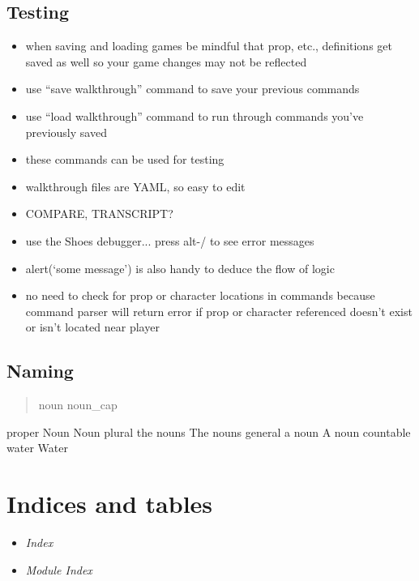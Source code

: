 \documentclass[letterpaper,10pt,english]{manual}
\begin{document}
\section{Testing}
\begin{itemize}
\item {} 
when saving and loading games be mindful that prop, etc., definitions get saved as well so your game changes may not be
reflected

\item {} 
use ``save walkthrough'' command to save your previous commands

\item {} 
use ``load walkthrough'' command to run through commands you've previously saved

\item {} 
these commands can be used for testing

\item {} 
walkthrough files are YAML, so easy to edit

\item {} 
COMPARE, TRANSCRIPT?

\item {} 
use the Shoes debugger... press alt-/ to see error messages

\item {} 
alert(`some message') is also handy to deduce the flow of logic

\item {} 
no need to check for prop or character locations in commands because command parser will return error if prop or character referenced doesn't exist or isn't located near player

\end{itemize}


\section{Naming}
\begin{quote}

noun      noun\_cap
\end{quote}

proper    Noun      Noun
plural    the nouns The nouns
general   a noun    A noun
countable water     Water


\chapter{Indices and tables}
\begin{itemize}
\item {} 
\emph{Index}

\item {} 
\emph{Module Index}

\end{itemize}


\renewcommand{\indexname}{Module Index}
\printmodindex
\renewcommand{\indexname}{Index}
\printindex
\end{document}
